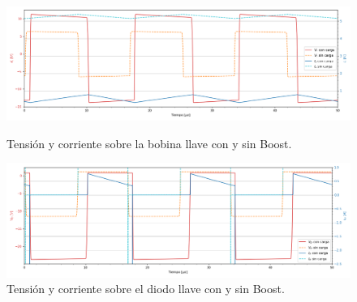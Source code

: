 \begin{figure}[H]
	\centering
	\begin{minipage}{0.495\textwidth}
		\centering
		\includegraphics[width=\linewidth]{ImagenesEjercicio-3/il-vl-1v3}
		\caption{Tensión y corriente sobre la bobina llave con y sin Boost.}
		\label{fig:ej3:Il_Vl_SWITCH_BOOST}
	\end{minipage}\hfill
	\begin{minipage}{0.495\textwidth}
		\centering
		\includegraphics[width=\linewidth]{ImagenesEjercicio-3/id-vd-1v3}
		\caption{Tensión y corriente sobre el diodo llave con y sin Boost.}
		\label{fig:ej3:Id_Vd_SWITCH_BOOST}
	\end{minipage}\hfill
\end{figure}




%
